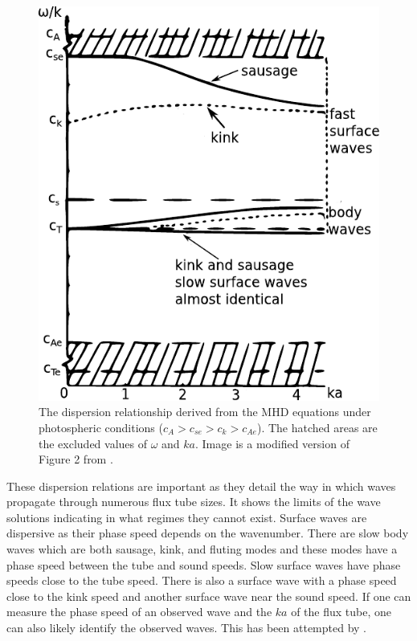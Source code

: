     \begin{figure}
   	\centering
   	\includegraphics[width=\textwidth]{dispersion}
   	\caption{
   		     The dispersion relationship derived from the MHD equations under photospheric conditions ($c_A > c_{se} > c_k > c_{Ae} $).
   		     The hatched areas are the excluded  values of $\omega$ and $ka$.
   	 	     Image is a modified version of Figure 2 from \cite{WPMC}.
   	        }
   	\label{fig:disper}
    \end{figure}
           
    These dispersion relations are important as they detail the way in which waves propagate through numerous flux tube sizes.
    It shows the limits of the wave solutions indicating in what regimes they cannot exist.
    Surface waves are dispersive as their phase speed depends on the wavenumber.
    There are slow body waves which are both sausage, kink, and fluting modes and these modes have a phase speed between the tube and sound speeds.
    Slow surface waves have phase speeds close to the tube speed. 
    There is also a surface wave with a phase speed close to the kink speed and another surface wave near the sound speed.
    If one can measure the phase speed of an observed wave and the $ka$ of the flux tube, one can also likely identify the observed waves.
    This has been attempted by \cite{2015A&A...579A..73M}.
    
